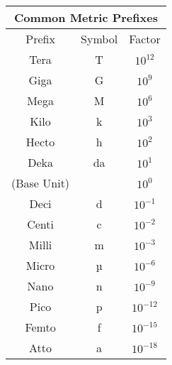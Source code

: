 \documentclass[10pt, roman]{article}
\begin{document}
\noindent
\begin{minipage}{.5\textwidth}
\centering
\begin{tabular}{|c|c|c|}
\hline
\multicolumn{3}{|c|}{\textbf{Common Metric Prefixes}} \\
\hline
Prefix & Symbol & Factor \\
\hline
Tera & T & $10^{12}$ \\
Giga & G & $10^{9}$ \\
Mega & M & $10^{6}$ \\
Kilo & k & $10^{3}$ \\
Hecto & h & $10^{2}$ \\
Deka & da & $10^{1}$ \\
\hline
(Base Unit) &  & $10^{0}$ \\
\hline
Deci & d & $10^{-1}$ \\
Centi & c & $10^{-2}$ \\
Milli & m & $10^{-3}$ \\
Micro & µ & $10^{-6}$ \\
Nano & n & $10^{-9}$ \\
Pico & p & $10^{-12}$ \\
Femto & f & $10^{-15}$ \\
Atto & a & $10^{-18}$ \\
\hline
\end{tabular}
\end{minipage}
\end{document}
